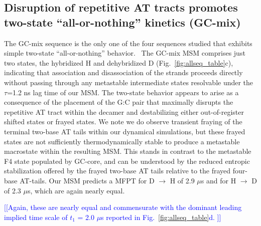 \documentclass[journal=jpcbfk,manuscript=article]{achemso}
\newcommand*{\noteb}[1]{\textcolor{blue}{[[#1]]}}		%
\begin{document}



\subsection{Disruption of repetitive AT tracts promotes two-state ``all-or-nothing'' kinetics (GC-mix)}

The GC-mix sequence is the only one of the four sequences studied that exhibits simple two-state ``all-or-nothing'' behavior.~\citep{Xiao2019, Araque2016LatticeCooperativity, Sikora2013ModelingIntermediates, Sanstead2016} The GC-mix MSM comprises just two states, the hybridized H and dehybridized D (Fig.~\ref{fig:allseq_table}c), indicating that association and disassociation of the strands proceeds directly without passing through any metastable intermediate states resolvable under the $\tau$=1.2 ns lag time of our MSM. The two-state behavior appears to arise as a consequence of the placement of the G:C pair that maximally disrupts the repetitive AT tract within the decamer and destabilizing either out-of-register shifted states or frayed states. We note we do observe transient fraying of the terminal two-base AT tails within our dynamical simulations, but these frayed states are not sufficiently thermodynamically stable to produce a metastable macrostate within the resulting MSM. This stands in contrast to the metastable F4 state populated by GC-core, and can be understood by the reduced entropic stabilization offered by the frayed two-base AT tails relative to the frayed four-base AT-tails. Our MSM predicts a MFPT for D $\rightarrow$ H of 2.9 $\mu$s and for H $\rightarrow$ D of 2.3 $\mu$s, which are again nearly equal.

\noteb{Again, these are nearly equal and commensurate with the dominant leading implied time scale of $t_1$ = 2.0 $\mu$s reported in Fig.~\ref{fig:allseq_table}d. }
\end{document}
